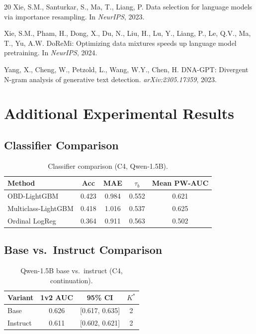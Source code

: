 \documentclass[11pt,a4paper]{article}
\begin{document}
\begin{thebibliography}{20}
Xie, S.M., Santurkar, S., Ma, T., Liang, P.
\newblock Data selection for language models via importance resampling.
\newblock In \emph{NeurIPS}, 2023.

Xie, S.M., Pham, H., Dong, X., Du, N., Liu, H., Lu, Y., Liang, P., Le, Q.V., Ma, T., Yu, A.W.
\newblock DoReMi: Optimizing data mixtures speeds up language model pretraining.
\newblock In \emph{NeurIPS}, 2024.

Yang, X., Cheng, W., Petzold, L., Wang, W.Y., Chen, H.
\newblock DNA-GPT: Divergent N-gram analysis of generative text detection.
\newblock \emph{arXiv:2305.17359}, 2023.

\end{thebibliography}

\appendix
\section{Additional Experimental Results}

\subsection{Classifier Comparison}

\begin{table}[h]
\centering
\small
\caption{Classifier comparison (C4, Qwen-1.5B).}
\label{tab:classifier}
\begin{tabular}{lcccc}
\toprule
Method & Acc & MAE & $\tau_b$ & Mean PW-AUC \\
\midrule
OBD-LightGBM       & 0.423 & 0.984 & 0.552 & 0.621 \\
Multiclass-LightGBM & 0.418 & 1.016 & 0.537 & 0.625 \\
Ordinal LogReg      & 0.364 & 0.911 & 0.563 & 0.502 \\
\bottomrule
\end{tabular}
\end{table}

\subsection{Base vs.\ Instruct Comparison}

\begin{table}[h]
\centering
\small
\caption{Qwen-1.5B base vs.\ instruct (C4, continuation).}
\label{tab:base_instruct}
\begin{tabular}{lccc}
\toprule
Variant & 1v2 AUC & 95\% CI & $K^*$ \\
\midrule
Base     & 0.626 & [0.617, 0.635] & 2 \\
Instruct & 0.611 & [0.602, 0.621] & 2 \\
\bottomrule
\end{tabular}
\end{table}
\end{document}
